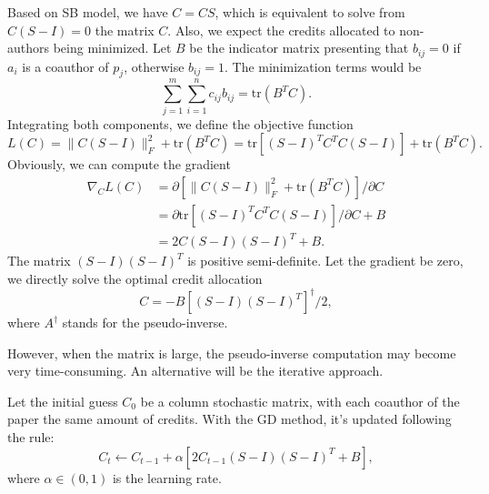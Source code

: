 \documentclass[12pt]{article}
\numberwithin{table}{section}
\begin{document}
Based on SB model, we have $C=C S$, which is equivalent to solve from $C(S-I)=0$ the matrix $C$.
Also, we expect the credits allocated to non-authors being minimized. Let $B$ be the indicator matrix presenting that $b_{ij}=0$ if $a_i$ is a coauthor of $p_j$, otherwise $b_{ij}=1$. The minimization terms would be 
\[
\sum_{j=1}^m \sum_{i=1}^n c_{ij} b_{ij}=\textrm{tr}(B^T C).
\]
Integrating both components, we define the objective function
\[
L(C) = \|C(S-I)\|_F^2 + \textrm{tr}(B^T C)=\textrm{tr}[(S-I)^T C^T C(S-I)] + \textrm{tr}(B^T C).
\]
Obviously, we can compute the gradient 
\[
\begin{array}{rl}
\nabla_C L(C) & = \partial [\|C(S-I)\|_F^2 + \textrm{tr}(B^T C)]/\partial C\\
&=\partial \textrm{tr}[(S-I)^T C^T C(S-I)]/\partial C + B\\
&=2C(S-I)(S-I)^T + B.
\end{array}
\]
The matrix $(S-I)(S-I)^T$ is positive semi-definite. Let the gradient be zero, we directly solve the optimal credit allocation
\[
C=-B[(S-I)(S-I)^T]^{\dagger}/2,
\]
where $A^\dagger$ stands for the pseudo-inverse.

However, when the matrix is large, the pseudo-inverse computation may become very time-consuming. An alternative will be the iterative approach.

Let the initial guess $C_0$ be a column stochastic matrix, with each coauthor of the paper the same amount of credits. With the GD method, it's updated following the rule:
\[
C_t \leftarrow C_{t-1} + \alpha [2C_{t-1}(S-I)(S-I)^T + B],
\]
where $\alpha\in (0,1)$ is the learning rate.

%


\end{document}
